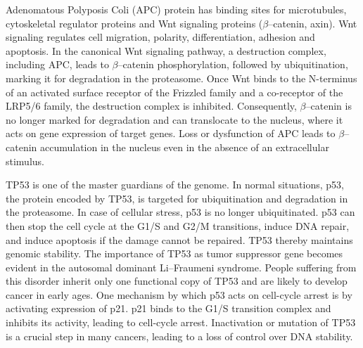 {{{      Adenomatous Polyposis Coli (APC) protein has binding sites for
      microtubules, cytoskeletal regulator proteins and Wnt signaling proteins
      ($\beta$--catenin, axin). Wnt signaling regulates cell migration,
      polarity, differentiation, adhesion and apoptosis. In the canonical Wnt
      signaling pathway, a destruction complex, including APC, leads to
      $\beta$--catenin phosphorylation, followed by ubiquitination, marking it
      for degradation in the proteasome. Once Wnt binds to the N-terminus of an
      activated surface receptor of the Frizzled family and a
      co-receptor of the LRP5/6 family, the destruction complex is inhibited.
      Consequently, $\beta$--catenin is no longer marked for degradation and can
      translocate to the nucleus, where it acts on gene
      expression of target genes. Loss or dysfunction of APC leads to
      $\beta$--catenin accumulation in the nucleus even in the absence of  an
      extracellular stimulus.

      TP53 is one of the master guardians of the genome. In normal situations,
      p53, the protein encoded by TP53, is targeted for ubiquitination and
      degradation in the proteasome. In case of cellular stress, p53 is no
      longer ubiquitinated. p53 can then stop the cell cycle at the G1/S and
      G2/M transitions, induce DNA repair, and induce apoptosis if the damage
      cannot be repaired. TP53 thereby maintains genomic stability. The
      importance of TP53 as tumor suppressor gene becomes evident in the
      autosomal dominant Li--Fraumeni syndrome. People suffering from this
      disorder inherit only one functional copy of TP53 and are likely to
      develop cancer in early ages. One mechanism by which p53 acts on
      cell-cycle arrest is by activating expression of p21. p21 binds to the
      G1/S transition complex and inhibits its activity, leading to cell-cycle
      arrest. Inactivation or mutation of TP53 is a crucial step in many
      cancers, leading to a loss of control over DNA stability.

}}}
